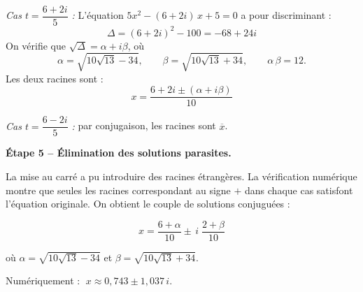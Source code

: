 \documentclass[a4paper,12pt]{article}
\begin{document}
\medskip

\noindent\textit{Cas $t = \dfrac{6+2i}{5}$ :}
L'\'equation $5x^2 - (6+2i)\,x + 5 = 0$ a pour discriminant :
\[
  \Delta = (6+2i)^2 - 100 = -68 + 24i
\]
On v\'erifie que $\sqrt{\Delta} = \alpha + i\beta$, o\`u
\[
  \alpha = \sqrt{10\sqrt{13} - 34}, \qquad \beta = \sqrt{10\sqrt{13} + 34}, \qquad \alpha\,\beta = 12.
\]
Les deux racines sont :
\[
  x = \frac{6 + 2i \pm (\alpha + i\beta)}{10}
\]

\medskip

\noindent\textit{Cas $t = \dfrac{6-2i}{5}$ :} par conjugaison, les racines sont $\overline{x}$.

\bigskip

\textbf{\'Etape 5 -- \'Elimination des solutions parasites.}

La mise au carr\'e a pu introduire des racines \'etrang\`eres. La v\'erification num\'erique montre que seules les racines correspondant au signe $+$ dans chaque cas satisfont l'\'equation originale. On obtient le couple de solutions conjugu\'ees :

\[
\boxed{x = \frac{6 + \alpha}{10} \pm \, i\;\frac{2 + \beta}{10}}
\]

o\`u $\alpha = \sqrt{10\sqrt{13} - 34}$ et $\beta = \sqrt{10\sqrt{13} + 34}$.

\bigskip

Num\'eriquement : $\;x \approx 0{,}743 \pm 1{,}037\,i$.
\end{document}
